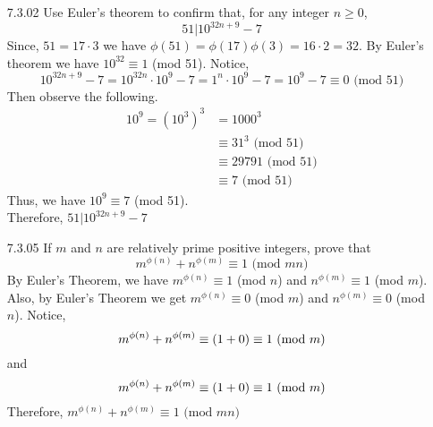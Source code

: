 \documentclass[12pt]{article}
\begin{document}
\begin{enumerate}
	\item[7.3.02] Use Euler's theorem to confirm that, for any integer $ n \geq 0 $,
	\[51|10^{32n+9}-7\]
	Since, $ 51 = 17\cdot3$ we have $ \phi(51)=\phi(17)\phi(3)=16\cdot2=32 $. By Euler's theorem we have $ 10^{32} \equiv 1 $ (mod 51). Notice,
		\[10^{32n+9}-7 = 10^{32n}\cdot10^9-7 = 1^n \cdot 10^9-7=10^9-7\equiv0 \text{ (mod 51)}\]
	Then observe the following. 
	\begin{align*}
		10^9=(10^3)^3 &= 1000^3 \\
			&\equiv 31^3 \text{ (mod 51)}\\
			&\equiv 29791 \text{ (mod 51)}\\
	    	&\equiv 7 \text{ (mod 51)}
	\end{align*}
	Thus, we have $ 10^9 \equiv 7 $ (mod 51).\\
	Therefore, $51|10^{32n+9}-7$
		
	\item[7.3.05] If $ m $ and $ n $ are relatively prime positive integers, prove that
	\[m^{\phi(n)}+n^{\phi(m)}\equiv 1 \text{ (mod $mn  $)} \]
		By Euler's Theorem, we have $ m^{\phi(n)}\equiv1 $ (mod $ n $) and $ n^{\phi(m)}\equiv 1 $ (mod $ m $). Also, by Euler's Theorem we get $ m^{\phi(n)} \equiv 0$ (mod $ m $) and $ n^{\phi(m)}\equiv0 $ (mod $ n $). Notice,
		\[m^{\phi(n)}+n^{\phi(m)}\equiv(1+0)\equiv 1 \text{ (mod $ m $)} \]
		and
		\[m^{\phi(n)}+n^{\phi(m)}\equiv(1+0)\equiv 1 \text{ (mod $ m $)} \]
		Therefore, $m^{\phi(n)}+n^{\phi(m)}\equiv 1 \text{ (mod $mn  $)}$
	

\end{enumerate}
\end{document}

